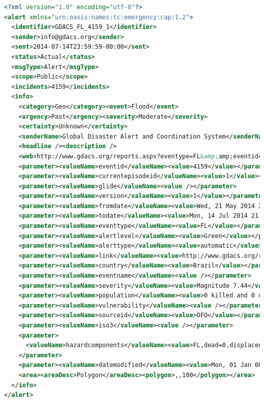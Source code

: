 \documentclass[letterpaper]{article}
\begin{document}
\begin{lstlisting}[caption={\emph{Common Alerting Protocol} feed
  via the \emph{Global Disaster Alert and Coordination System}
  (\url{http://www.gdacs.org/xml/gdacs_cap.xml}, 2014-07-16)},
  label=listing:cap, language=xml,morekeywords={xmlns,encoding,alert,
  identifier,sender,sent,status,msgType,scope,incidents,info,
  category,event,urgency,severity,certainty, senderName,headline,
  description,web,parameter,value,valueName,area,areaDesc,polygon},
  float=*b, stringstyle=\color{gray}, ]
<?xml version="1.0" encoding="utf-8"?>
<alert xmlns="urn:oasis:names:tc:emergency:cap:1.2">
  <identifier>GDACS_FL_4159_1</identifier>
  <sender>info@gdacs.org</sender>
  <sent>2014-07-14T23:59:59-00:00</sent>
  <status>Actual</status>
  <msgType>Alert</msgType>
  <scope>Public</scope>
  <incidents>4159</incidents>
  <info>
    <category>Geo</category><event>Flood</event>
    <urgency>Past</urgency><severity>Moderate</severity>
    <certainty>Unknown</certainty>
    <senderName>Global Disaster Alert and Coordination System</senderName>
    <headline /><description />
    <web>http://www.gdacs.org/reports.aspx?eventype=FL&amp;amp;eventid=4159</web>
    <parameter><valueName>eventid</valueName><value>4159</value></parameter>
    <parameter><valueName>currentepisodeid</valueName><value>1</value></parameter>
    <parameter><valueName>glide</valueName><value /></parameter>
    <parameter><valueName>version</valueName><value>1</value></parameter>
    <parameter><valueName>fromdate</valueName><value>Wed, 21 May 2014 22:00:00 GMT</value></parameter>
    <parameter><valueName>todate</valueName><value>Mon, 14 Jul 2014 21:59:59 GMT</value></parameter>
    <parameter><valueName>eventtype</valueName><value>FL</value></parameter>
    <parameter><valueName>alertlevel</valueName><value>Green</value></parameter>
    <parameter><valueName>alerttype</valueName><value>automatic</value></parameter>
    <parameter><valueName>link</valueName><value>http://www.gdacs.org/report.aspx?eventtype=FL&amp;amp;eventid=4159</value></parameter>
    <parameter><valueName>country</valueName><value>Brazil</value></parameter>
    <parameter><valueName>eventname</valueName><value /></parameter>
    <parameter><valueName>severity</valueName><value>Magnitude 7.44</value></parameter>
    <parameter><valueName>population</valueName><value>0 killed and 0 displaced</value></parameter>
    <parameter><valueName>vulnerability</valueName><value /></parameter>
    <parameter><valueName>sourceid</valueName><value>DFO</value></parameter>
    <parameter><valueName>iso3</valueName><value /></parameter>
    <parameter>
      <valueName>hazardcomponents</valueName><value>FL,dead=0,displaced=0,main_cause=Heavy Rain,severity=2,sqkm=256564.57</value>
    </parameter>
    <parameter><valueName>datemodified</valueName><value>Mon, 01 Jan 0001 00:00:00 GMT</value></parameter>
    <area><areaDesc>Polygon</areaDesc><polygon>,,100</polygon></area>
  </info>
</alert>
\end{lstlisting}
\end{document}
